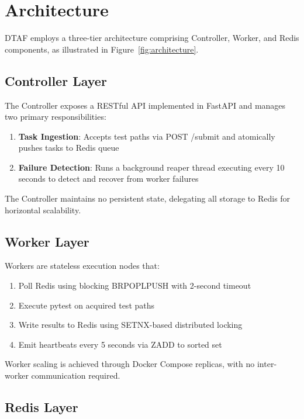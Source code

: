 \documentclass[11pt,a4paper]{article}
\begin{document}
\section{Architecture}

DTAF employs a three-tier architecture comprising Controller, Worker, and Redis components, as illustrated in Figure~\ref{fig:architecture}.

\subsection{Controller Layer}

The Controller exposes a RESTful API implemented in FastAPI and manages two primary responsibilities:

\begin{enumerate}
    \item \textbf{Task Ingestion}: Accepts test paths via POST /submit and atomically pushes tasks to Redis queue
    \item \textbf{Failure Detection}: Runs a background reaper thread executing every 10 seconds to detect and recover from worker failures
\end{enumerate}

The Controller maintains no persistent state, delegating all storage to Redis for horizontal scalability.

\subsection{Worker Layer}

Workers are stateless execution nodes that:
\begin{enumerate}
    \item Poll Redis using blocking BRPOPLPUSH with 2-second timeout
    \item Execute pytest on acquired test paths
    \item Write results to Redis using SETNX-based distributed locking
    \item Emit heartbeats every 5 seconds via ZADD to sorted set
\end{enumerate}

Worker scaling is achieved through Docker Compose replicas, with no inter-worker communication required.

\subsection{Redis Layer}
\end{document}
